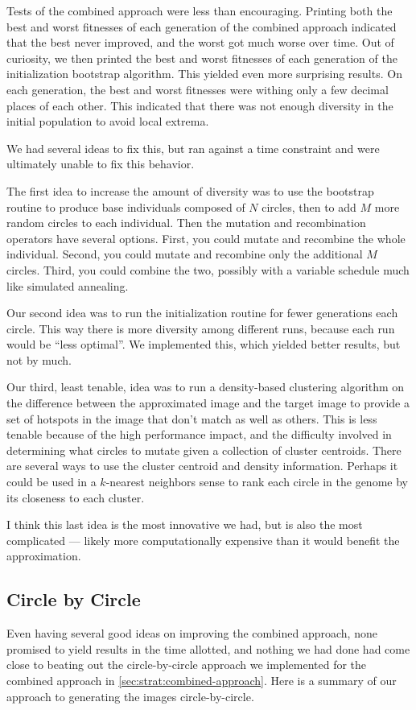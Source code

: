 \documentclass{article}
\begin{document}
Tests of the combined approach were less than encouraging. Printing both the best and worst fitnesses of each generation of the combined approach indicated that the best never improved, and the worst got much worse over time. Out of curiosity, we then printed the best and worst fitnesses of each generation of the initialization bootstrap algorithm. This yielded even more surprising results. On each generation, the best and worst fitnesses were withing only a few decimal places of each other. This indicated that there was not enough diversity in the initial population to avoid local extrema.

We had several ideas to fix this, but ran against a time constraint and were ultimately unable to fix this behavior.

The first idea to increase the amount of diversity was to use the bootstrap routine to produce base individuals composed of $N$ circles, then to add $M$ more random circles to each individual. Then the mutation and recombination operators have several options. First, you could mutate and recombine the whole individual. Second, you could mutate and recombine only the additional $M$ circles. Third, you could combine the two, possibly with a variable schedule much like simulated annealing.

Our second idea was to run the initialization routine for fewer generations each circle. This way there is more diversity among different runs, because each run would be ``less optimal''. We implemented this, which yielded better results, but not by much.

Our third, least tenable, idea was to run a density-based clustering algorithm on the difference between the approximated image and the target image to provide a set of hotspots in the image that don't match as well as others. This is less tenable because of the high performance impact, and the difficulty involved in determining what circles to mutate given a collection of cluster centroids. There are several ways to use the cluster centroid and density information. Perhaps it could be used in a $k$-nearest neighbors sense to rank each circle in the genome by its closeness to each cluster.

I think this last idea is the most innovative we had, but is also the most complicated --- likely more computationally expensive than it would benefit the approximation.

\subsection{Circle by Circle}\label{sec:strat:circle-by-circle}
Even having several good ideas on improving the combined approach, none promised to yield results in the time allotted, and nothing we had done had come close to beating out the circle-by-circle approach we implemented for the combined approach in \autoref{sec:strat:combined-approach}. Here is a summary of our approach to generating the images circle-by-circle.
\end{document}
